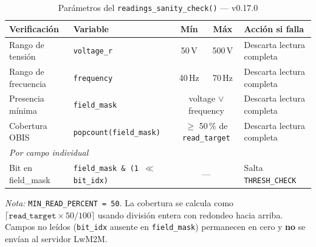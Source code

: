 
\begin{table}[htbp]
\centering
\caption{Parámetros del \texttt{readings\_sanity\_check()} — v0.17.0}
\label{tab:sanity-check-v017}
\begin{tabular}{l l c c l}
\toprule
\textbf{Verificación} & \textbf{Variable} & \textbf{Mín} & \textbf{Máx} & \textbf{Acción si falla} \\
\midrule
Rango de tensión  & \texttt{voltage\_r}  & 50\,V   & 500\,V  & Descarta lectura completa \\
Rango de frecuencia & \texttt{frequency} & 40\,Hz  & 70\,Hz  & Descarta lectura completa \\
Presencia mínima  & \texttt{field\_mask} & \multicolumn{2}{c}{voltage $\lor$ frequency} & Descarta lectura completa \\
Cobertura OBIS    & \texttt{popcount(field\_mask)} & \multicolumn{2}{c}{$\geq$ 50\,\% de \texttt{read\_target}} & Descarta lectura completa \\
\midrule
\multicolumn{5}{l}{\textit{Por campo individual}} \\
Bit en field\_mask & \texttt{field\_mask \& (1 $\ll$ bit\_idx)} & \multicolumn{2}{c}{---} & Salta \texttt{THRESH\_CHECK} \\
\bottomrule
\end{tabular}

\smallskip
\footnotesize
\textit{Nota:} \texttt{MIN\_READ\_PERCENT = 50}. La cobertura se calcula como
$\lceil\texttt{read\_target} \times 50 / 100\rceil$ usando división entera con redondeo hacia arriba.
Campos no leídos (\texttt{bit\_idx} ausente en \texttt{field\_mask}) permanecen en cero y
\textbf{no} se envían al servidor LwM2M.
\end{table}
